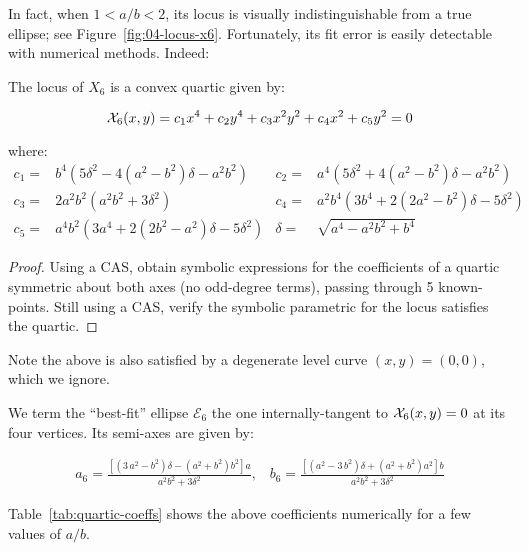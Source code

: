In fact, when $1<a/b<2$, its locus is visually indistinguishable from a true ellipse; see Figure~\ref{fig:04-locus-x6}. Fortunately, its fit error is easily detectable with numerical methods. Indeed:

\begin{proposition}
The locus of $X_6$ is a convex quartic given by:

\begin{equation*}
  \mathcal{X}_6(x,y)=c_1 x^4+c_2 y^4+c_3 x^2 y^2+ c_4 x^2 + c_5 y^2 = 0
\end{equation*}

\noindent where:
$$
\begin{array}{rlrl}
c_1=&b^4(5\delta^2-4(a^2-b^2)\delta -a^2 b^2)&c_2=&a^4(5\delta^2+4(a^2-b^2)\delta-a^2b^2) \\
c_3=&2a^2 b^2(a^2 b^2+3\delta^2)&c_4=&a^2 b^4(3 b^4+2(2 a^2-b^2)\delta-5\delta^2)\\
c_5=&a^4 b^2(3 a^4+2(2 b^2-a^2)\delta-5\delta^2)&\delta=&\sqrt{a^4-a^2 b^2+b^4}
\end{array}
$$
\end{proposition}

\begin{proof}
Using a CAS, obtain symbolic expressions for the coefficients of a quartic symmetric about both axes (no odd-degree terms), passing through 5 known-points. Still using a CAS, verify the symbolic parametric for the locus satisfies the quartic.
\end{proof}

 \noindent Note the above is also satisfied by a degenerate level curve $(x,y)=(0,0)$, which we ignore.

\begin{remark}
We term the ``best-fit'' ellipse $\mathcal{E}_6$ the one internally-tangent to $\mathcal{X}_6(x,y)=0$ at its four vertices. Its semi-axes are given by: 

{\small  
\begin{align*}
a_6= \frac{\left[(3\,a^2-b^2)\delta -(a^2+b^2)b^2\right]a}{a^2b^2+3\delta^2},\;\;\;
b_6= \frac{\left[(a^2-3\,b^2)\delta + (a^2+b^2)a^2\right]b}{a^2b^2+3\delta^2}
\label{eqn:x6-ellipse}
\end{align*}
}
\end{remark}

Table~\ref{tab:quartic-coeffs} shows the above coefficients numerically for a few values of $a/b$.

